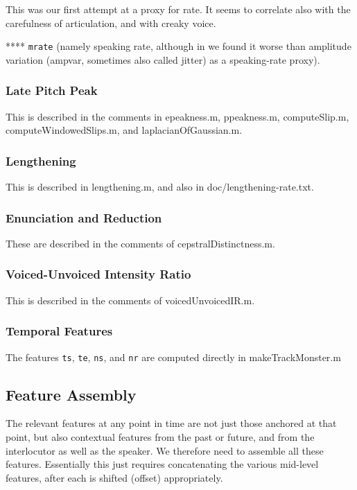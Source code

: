 \documentclass[11pt]{article}
\begin{document}
This was our first attempt at a proxy for rate.  It seems to correlate
also with the carefulness of articulation, and with creaky voice.

**** {\tt mrate}
(namely speaking rate, although in \cite{timelm} we found it worse
than amplitude variation (ampvar, sometimes also called jitter) as a
speaking-rate proxy).


\subsubsection{Late Pitch Peak}

This is described in the comments in epeakness.m, ppeakness.m,
computeSlip.m, computeWindowedSlips.m, and laplacianOfGaussian.m. 

\subsubsection{Lengthening}

This is described in lengthening.m, and also in doc/lengthening-rate.txt.

\subsubsection{Enunciation and Reduction}

These are described in the comments of cepstralDistinctness.m.

\subsubsection{Voiced-Unvoiced Intensity Ratio}

This is described in the comments of voicedUnvoicedIR.m.

\subsubsection{Temporal Features}

The features {\tt ts}, {\tt te}, {\tt ns}, and {\tt nr} are computed
directly in makeTrackMonster.m

\subsection{Feature Assembly}

The relevant features at any point in time are not just those anchored
at that point, but also contextual features from the past or future,
and from the interlocutor as well as the speaker.  We therefore need
to assemble all these features.  Essentially this just requires
concatenating the various mid-level features, after each is shifted
(offset) appropriately.
\end{document}
